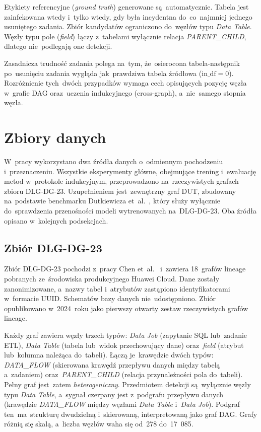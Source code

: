 Etykiety referencyjne (\emph{ground truth}) generowane są~automatycznie.
Tabela jest zainfekowana wtedy i~tylko wtedy, gdy była incydentna
do~co~najmniej jednego usuniętego zadania. Zbiór kandydatów ograniczono
do~węzłów typu \emph{Data Table}. Węzły typu pole (\emph{field}) łączy
z~tabelami wyłącznie relacja \emph{PARENT\_CHILD}, dlatego nie~podlegają one detekcji.

Zasadnicza trudność zadania polega na~tym, że~osierocona tabela-następnik
po~usunięciu zadania wygląda jak~prawdziwa tabela źródłowa
($\mathrm{in\_df} = 0$). Rozróżnienie tych~dwóch przypadków wymaga cech
opisujących pozycję węzła w~grafie DAG oraz~uczenia indukcyjnego
(cross-graph), a~nie~samego stopnia węzła.

\section{Zbiory danych}
\label{sec:dane}

W~pracy wykorzystano dwa źródła danych o~odmiennym pochodzeniu i~przeznaczeniu.
Wszystkie eksperymenty główne, obejmujące trening i~ewaluację metod
w~protokole indukcyjnym, przeprowadzono na~rzeczywistych grafach zbioru
DLG-DG-23. Uzupełnieniem jest~zewnętrzny graf DUT, zbudowany na~podstawie
benchmarku Dutkiewicza et~al.~\cite{Dutkiewicz2026}, który służy wyłącznie
do~sprawdzenia przenośności modeli wytrenowanych na~DLG-DG-23. Oba źródła
opisano w~kolejnych podsekcjach.

\subsection{Zbiór DLG-DG-23}
\label{sec:dane-dlg}

Zbiór DLG-DG-23 pochodzi z~pracy Chen et~al.~\cite{Chen2024}
i~zawiera 18~grafów lineage pobranych ze~środowiska produkcyjnego
Huawei Cloud. Dane zostały zanonimizowane, a~nazwy tabel i~atrybutów
zastąpiono identyfikatorami w~formacie UUID. Schematów bazy danych
nie~udostępniono. Zbiór opublikowano w~2024~roku jako pierwszy
otwarty zestaw rzeczywistych grafów lineage.

Każdy graf zawiera węzły trzech typów: \emph{Data Job} (zapytanie SQL
lub~zadanie ETL), \emph{Data Table}
(tabela lub~widok przechowujący dane) oraz~\emph{field} (atrybut lub~kolumna
należąca do~tabeli). Łączą je~krawędzie dwóch typów: \emph{DATA\_FLOW}
(skierowana krawędź przepływu danych między tabelą a~zadaniem)
oraz~\emph{PARENT\_CHILD} (relacja przynależności pola do~tabeli). Pełny
graf jest~zatem \emph{heterogeniczny}. Przedmiotem detekcji są~wyłącznie
węzły typu \emph{Data Table}, a~sygnał czerpany jest z~podgrafu przepływu
danych (krawędzie \emph{DATA\_FLOW} między węzłami \emph{Data Table}
i~\emph{Data Job}). Podgraf ten~ma~strukturę dwudzielną i~skierowaną,
interpretowaną jako graf DAG. Grafy różnią się skalą, a~liczba węzłów waha się
od~278 do~17~085.

